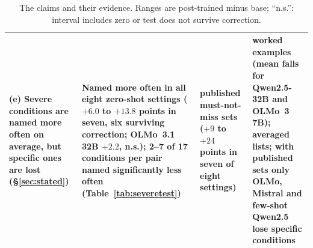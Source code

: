 \documentclass[wcp]{jmlr}
\begin{document}
\begin{table}[p]
\begin{tabular}{L{2.8cm}L{4.6cm}L{3.4cm}L{3.6cm}}
(e) Severe conditions are named more often on average, but specific ones are lost (\S\ref{sec:stated}) & Named more often in all eight zero-shot settings ($+6.0$ to $+13.8$ points in seven, six surviving correction; OLMo~3.1 32B $+2.2$, n.s.); 2--7 of 17 conditions per pair named significantly less often (Table~\ref{tab:severetest}) & published must-not-miss sets ($+9$ to $+24$ points in seven of eight settings) & worked examples (mean falls for Qwen2.5-32B and OLMo~3 7B); averaged lists; with published sets only OLMo, Mistral and few-shot Qwen2.5 lose specific conditions \\
\bottomrule
\end{tabular}
\caption{The claims and their evidence. Ranges are post-trained minus base; ``n.s.'': interval includes zero or test does not survive correction.}
\label{tab:claims}
\end{table}
\end{document}
